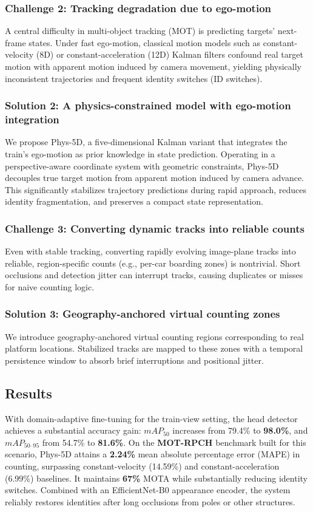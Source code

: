 \subsubsection{Challenge 2: Tracking degradation due to ego-motion}
A central difficulty in multi-object tracking (MOT) is predicting targets’ next-frame states\cite{104,103}. Under fast ego-motion, classical motion models such as constant-velocity (8D) or constant-acceleration (12D) Kalman filters confound real target motion with apparent motion induced by camera movement, yielding physically inconsistent trajectories and frequent identity switches (ID switches).

\subsubsection{Solution 2: A physics-constrained model with ego-motion integration}
We propose Phys-5D, a five-dimensional Kalman variant that integrates the train’s ego-motion as prior knowledge in state prediction. Operating in a perspective-aware coordinate system with geometric constraints, Phys-5D decouples true target motion from apparent motion induced by camera advance. This significantly stabilizes trajectory predictions during rapid approach, reduces identity fragmentation, and preserves a compact state representation.

\subsubsection{Challenge 3: Converting dynamic tracks into reliable counts}
Even with stable tracking, converting rapidly evolving image-plane tracks into reliable, region-specific counts (e.g., per-car boarding zones) is nontrivial. Short occlusions and detection jitter can interrupt tracks, causing duplicates or misses for naive counting logic.

\subsubsection{Solution 3: Geography-anchored virtual counting zones}
We introduce geography-anchored virtual counting regions corresponding to real platform locations. Stabilized tracks are mapped to these zones with a temporal persistence window to absorb brief interruptions and positional jitter. 

\subsection{Results}
With domain-adaptive fine-tuning for the train-view setting, the head detector achieves a substantial accuracy gain: $mAP_{50}$ increases from 79.4\% to \textbf{98.0\%}, and $mAP_{50\text{--}95}$ from 54.7\% to \textbf{81.6\%}. On the \textbf{MOT-RPCH} benchmark built for this scenario, Phys-5D attains a \textbf{2.24\%} mean absolute percentage error (MAPE) in counting, surpassing constant-velocity (14.59\%) and constant-acceleration (6.99\%) baselines. It maintains \textbf{67\%} MOTA while substantially reducing identity switches. Combined with an EfficientNet-B0 appearance encoder, the system reliably restores identities after long occlusions from poles or other structures.

